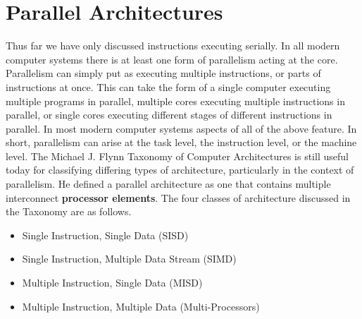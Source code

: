 \documentclass[10pt,a4paper]{article}
\begin{document}
\section{Parallel Architectures}
Thus far we have only discussed instructions executing serially. In all modern computer systems there is at least one form of parallelism acting at the core. Parallelism can simply put as executing multiple instructions, or parts of instructions at once. This can take the form of a single computer executing multiple programs in parallel, multiple cores executing multiple instructions in parallel, or single cores executing different stages of different instructions in parallel. In most modern computer systems aspects of all of the above feature. In short, parallelism can arise at the task level, the instruction level, or the machine level. 
\newline\newline
The Michael J. Flynn Taxonomy of Computer Architectures \cite{LOGICDESIGN} is still useful today for classifying differing types of architecture, particularly in the context of parallelism. He defined a parallel architecture as one that contains multiple interconnect {\bf processor elements}. The four classes of architecture discussed in the Taxonomy are as follows. 
\begin{itemize}
\item Single Instruction, Single Data (SISD)
\item Single Instruction, Multiple Data Stream (SIMD)
\item Multiple Instruction, Single Data (MISD)
\item Multiple Instruction, Multiple Data (Multi-Processors)
\end{itemize}
\end{document}
